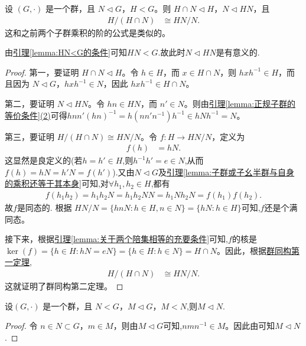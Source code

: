\documentclass[../../main.tex]{subfiles}
\begin{document}
\begin{theorem}[群同构第二定理]\label{theorem:群同构第二定理}
设 \((G, \cdot)\) 是一个群，且 \(N \lhd G\)，\(H < G\)。则 \(H \cap N \lhd H\)，\(N \lhd HN\)，且
\begin{align*}
H/(H \cap N) &\cong HN/N .
\end{align*}
这和之前两个子群乘积的阶的公式是类似的。
\end{theorem}
\begin{remark}
由\hyperref[lemma:HN<G的条件]{引理\ref{lemma:HN<G的条件}}可知$HN<G$.故此时\(N \lhd HN\)是有意义的.
\end{remark}
\begin{proof}
第一，要证明 \(H \cap N \lhd H\)。令 \(h \in H\)，而 \(x \in H \cap N\)，则 \(hxh^{-1} \in H\)，而且因为 \(N \lhd G\)，\(hxh^{-1} \in N\)，因此 \(hxh^{-1} \in H \cap N\)。

第二，要证明 \(N \lhd HN\)。令 \(hn \in HN\)，而 \(n' \in N\)。则由\hyperref[lemma:正规子群的等价条件]{引理\ref{lemma:正规子群的等价条件}(2)}可得\(hnn'(hn)^{-1} = h(nn'n^{-1})h^{-1} \in hNh^{-1} = N\)。

第三，要证明 \(H/(H \cap N) \cong HN/N\)。令 \(f: H \to HN/N\)，定义为
\begin{align*}
f(h) &= hN .
\end{align*}
这显然是良定义的(若$h=h'\in H$,则$h^{-1}h'=e\in N$,从而$f(h)=hN=h'N=f(h')$).又由\(N \lhd G\)及\hyperref[lemma:子群或子幺半群与自身的乘积还等于其本身]{引理\ref{lemma:子群或子幺半群与自身的乘积还等于其本身}}可知,对$\forall h_1,h_2\in H$,都有
\begin{align*}
f\left( h_1h_2 \right) =h_1h_2N=h_1h_2NN=h_1Nh_2N=f\left( h_1 \right) f\left( h_2 \right) .
\end{align*}
故$f$是同态的.
根据 \(HN/N = \{hnN : h \in H, n \in N\} = \{hN : h \in H\}\)可知,$f$还是个满同态。

接下来，根据\hyperref[lemma:关于两个陪集相等的充要条件]{引理\ref{lemma:关于两个陪集相等的充要条件}}可知,$f$的核是 \(\ker(f) = \{h \in H : hN = eN\} = \{h \in H : h \in N\} = H \cap N\)。因此，根据\hyperref[theorem:群同构第一定理]{群同构第一定理},
\begin{align*}
H/(H \cap N) &\cong HN/N .
\end{align*}
这就证明了群同构第二定理。
\end{proof}

\begin{lemma}\label{lemma:正规子群的"传递性"}
设\((G, \cdot)\) 是一个群，且 \(N <G\)，\(M \lhd G\)，\(M < N\),则$M\lhd N.$ 
\end{lemma}
\begin{proof}
令 \(n \in N\subset G\)，\(m \in M\)，则由$M\lhd G$可知,\(nmn^{-1} \in M\)。因此由可知$M\lhd N$.
\end{proof}
\end{document}
